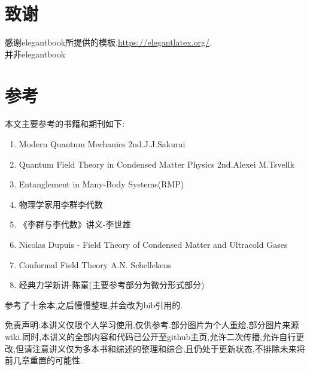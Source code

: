 \section{致谢}
感谢elegantbook所提供的模板,\href{https://elegantlatex.org/}{https://elegantlatex.org/}.\\
并非elegantbook

\section{参考}
本文主要参考的书籍和期刊如下:
\begin{enumerate}
    \item Modern Quantum Mechanics 2nd.J.J.Sakurai
    \item Quantum Field Theory in Condensed Matter Physics 2nd.Alexei M.Tsvellk
    \item Entanglement in Many-Body Systems(RMP)
    \item 物理学家用李群李代数
    \item 《李群与李代数》讲义-李世雄
    \item Nicolas Dupuis - Field Theory of Condensed Matter and Ultracold Gases
    \item Conformal Field Theory A.N. Schellekens
    \item 经典力学新讲-陈童(主要参考部分为微分形式部分)
\end{enumerate}
参考了十余本,之后慢慢整理,并会改为bib引用的.

免责声明:本讲义仅限个人学习使用,仅供参考.部分图片为个人重绘,部分图片来源wiki.同时,本讲义的全部内容和代码已公开至github主页,允许二次传播,允许自行更改,但请注意讲义仅为多本书和综述的整理和综合,且仍处于更新状态,不排除未来将前几章重置的可能性.
















